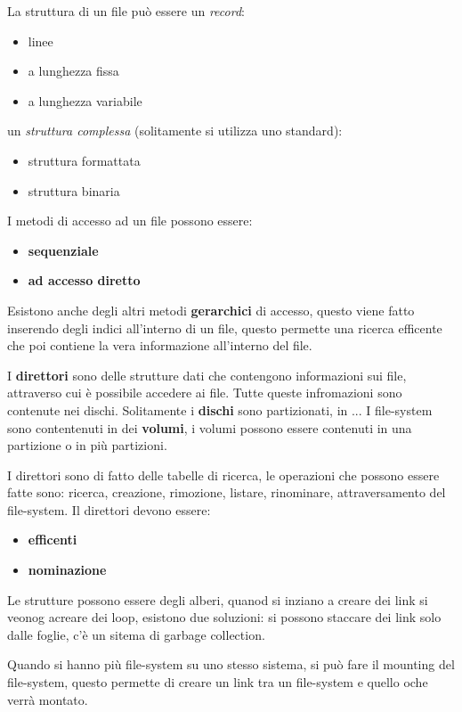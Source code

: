 \documentclass[12pt]{article}
\begin{document}
La struttura di un file pu\`o essere un \emph{record}:
\begin{itemize}
  \item linee 
  \item a lunghezza fissa 
  \item a lunghezza variabile 
\end{itemize}
un \emph{struttura complessa} (solitamente si utilizza uno standard):
\begin{itemize}
  \item struttura formattata 
  \item struttura binaria
\end{itemize}


I metodi di accesso ad un file possono essere: 
\begin{itemize}
  \item \textbf{sequenziale}
  \item \textbf{ad accesso diretto}
\end{itemize}
Esistono anche degli altri metodi \textbf{gerarchici} di accesso, questo viene fatto inserendo degli indici all'interno di un file, questo permette una ricerca efficente che poi contiene la vera informazione all'interno del file.

I \textbf{direttori} sono delle strutture dati che contengono informazioni sui file, attraverso cui \`e possibile accedere ai file. Tutte queste infromazioni sono contenute nei dischi. Solitamente i \textbf{dischi} sono partizionati, in ...  I file-system sono contentenuti in dei \textbf{volumi}, i volumi possono essere contenuti in una partizione o in pi\`u partizioni.

I direttori sono di fatto delle tabelle di ricerca, le operazioni che possono essere fatte sono: ricerca, creazione, rimozione, listare, rinominare, attraversamento del file-system. Il direttori devono essere:
\begin{itemize}
  \item \textbf{efficenti}
  \item \textbf{nominazione}
\end{itemize}
Le strutture possono essere degli alberi, quanod si inziano a creare dei link si veonog acreare dei loop, esistono due soluzioni: si possono staccare dei link solo dalle foglie, c'\`e un sitema di garbage collection.

Quando si hanno pi\`u file-system su uno stesso sistema, si pu\`o fare il mounting del file-system, questo permette di creare un link tra un file-system e quello oche verr\`a montato.
\end{document}
